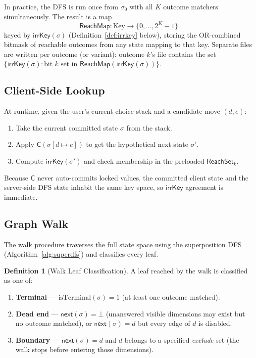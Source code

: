 \documentclass[11pt]{article}
\theoremstyle{definition}
\newtheorem{definition}[theorem]{Definition}
\newcommand{\sel}{\sigma}              %
\newcommand{\clean}{\mathsf{C}}        %
\newcommand{\ik}{\mathsf{irrKey}}      %
\begin{document}
In practice, the DFS is run once from $\sel_0$ with all $K$ outcome
matchers simultaneously. The result is a map
\[
  \mathsf{ReachMap} : \text{Key} \to \{0,\dots,2^K-1\}
\]
keyed by $\ik(\sel)$ (Definition~\ref{def:irrkey} below), storing the
OR-combined bitmask of reachable outcomes from any state mapping to that
key. Separate files are written per outcome (or variant): outcome $k$'s
file contains the set $\{\ik(\sel) : \text{bit } k \text{ set in }
\mathsf{ReachMap}(\ik(\sel))\}$.

\subsection{Client-Side Lookup}\label{sec:client}

At runtime, given the user's current choice stack and a candidate
move $(d,e)$:

\begin{enumerate}
  \item Take the current committed state $\sel$ from the stack.
  \item Apply $\clean(\sel[d \mapsto e])$ to get the hypothetical next
        state $\sel'$.
  \item Compute $\ik(\sel')$ and check membership in the preloaded
        $\mathsf{ReachSet}_k$.
\end{enumerate}

Because $\clean$ never auto-commits locked values, the committed client
state and the server-side DFS state inhabit the same key space, so
$\ik$ agreement is immediate.

\subsection{Graph Walk}\label{sec:walk}

The \textsf{walk} procedure traverses the full state space using the
superposition DFS (Algorithm~\ref{alg:superdfs}) and classifies every
leaf.

\begin{definition}[Walk Leaf Classification]\label{def:leafclass}
A leaf reached by the walk is classified as one of:
\begin{enumerate}[label=(\roman*)]
  \item \textbf{Terminal} --- $\mathrm{isTerminal}(\sel) = 1$
        (at least one outcome matched).
  \item \textbf{Dead end} --- $\mathsf{next}(\sel) = \bot$
        (unanswered visible dimensions may exist but no outcome matched),
        or $\mathsf{next}(\sel) = d$ but every edge of $d$ is disabled.
  \item \textbf{Boundary} --- $\mathsf{next}(\sel) = d$ and $d$ belongs
        to a specified \emph{exclude} set (the walk stops before entering
        those dimensions).
\end{enumerate}
\end{definition}
\end{document}
